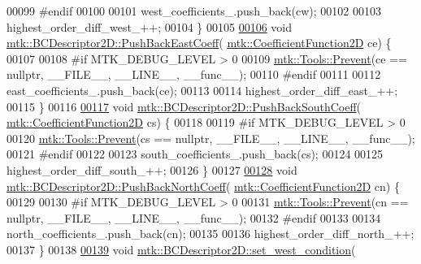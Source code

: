 \begin{DoxyCode}
00099 \textcolor{preprocessor}{  #endif}
00100 
00101   west\_coefficients\_.push\_back(cw);
00102 
00103   highest\_order\_diff\_west\_++;
00104 \}
00105 
\hypertarget{mtk__bc__descriptor__2d_8cc_source_l00106}{}\hyperlink{classmtk_1_1BCDescriptor2D_a27635428a6c36d1e305cafdc68271063}{00106} \textcolor{keywordtype}{void} \hyperlink{classmtk_1_1BCDescriptor2D_a27635428a6c36d1e305cafdc68271063}{mtk::BCDescriptor2D::PushBackEastCoeff}(
      \hyperlink{group__c07-mim__ops_gad9e1c0ace886b0029aefffa5f320e852}{mtk::CoefficientFunction2D} ce) \{
00107 
00108 \textcolor{preprocessor}{  #if MTK\_DEBUG\_LEVEL > 0}
00109   \hyperlink{classmtk_1_1Tools_a332324c6f25e66be9dff48c5987a3b9f}{mtk::Tools::Prevent}(ce == \textcolor{keyword}{nullptr}, \_\_FILE\_\_, \_\_LINE\_\_, \_\_func\_\_);
00110 \textcolor{preprocessor}{  #endif}
00111 
00112   east\_coefficients\_.push\_back(ce);
00113 
00114   highest\_order\_diff\_east\_++;
00115 \}
00116 
\hypertarget{mtk__bc__descriptor__2d_8cc_source_l00117}{}\hyperlink{classmtk_1_1BCDescriptor2D_a9eb891f14c68968a0113632fa5fea630}{00117} \textcolor{keywordtype}{void} \hyperlink{classmtk_1_1BCDescriptor2D_a9eb891f14c68968a0113632fa5fea630}{mtk::BCDescriptor2D::PushBackSouthCoeff}(
      \hyperlink{group__c07-mim__ops_gad9e1c0ace886b0029aefffa5f320e852}{mtk::CoefficientFunction2D} cs) \{
00118 
00119 \textcolor{preprocessor}{  #if MTK\_DEBUG\_LEVEL > 0}
00120   \hyperlink{classmtk_1_1Tools_a332324c6f25e66be9dff48c5987a3b9f}{mtk::Tools::Prevent}(cs == \textcolor{keyword}{nullptr}, \_\_FILE\_\_, \_\_LINE\_\_, \_\_func\_\_);
00121 \textcolor{preprocessor}{  #endif}
00122 
00123   south\_coefficients\_.push\_back(cs);
00124 
00125   highest\_order\_diff\_south\_++;
00126 \}
00127 
\hypertarget{mtk__bc__descriptor__2d_8cc_source_l00128}{}\hyperlink{classmtk_1_1BCDescriptor2D_a0fed58bd058d699a572888fe4b9934a4}{00128} \textcolor{keywordtype}{void} \hyperlink{classmtk_1_1BCDescriptor2D_a0fed58bd058d699a572888fe4b9934a4}{mtk::BCDescriptor2D::PushBackNorthCoeff}(
      \hyperlink{group__c07-mim__ops_gad9e1c0ace886b0029aefffa5f320e852}{mtk::CoefficientFunction2D} cn) \{
00129 
00130 \textcolor{preprocessor}{  #if MTK\_DEBUG\_LEVEL > 0}
00131   \hyperlink{classmtk_1_1Tools_a332324c6f25e66be9dff48c5987a3b9f}{mtk::Tools::Prevent}(cn == \textcolor{keyword}{nullptr}, \_\_FILE\_\_, \_\_LINE\_\_, \_\_func\_\_);
00132 \textcolor{preprocessor}{  #endif}
00133 
00134   north\_coefficients\_.push\_back(cn);
00135 
00136   highest\_order\_diff\_north\_++;
00137 \}
00138 
\hypertarget{mtk__bc__descriptor__2d_8cc_source_l00139}{}\hyperlink{classmtk_1_1BCDescriptor2D_a006050efe15b1be75b36a74a23051392}{00139} \textcolor{keywordtype}{void} \hyperlink{classmtk_1_1BCDescriptor2D_a006050efe15b1be75b36a74a23051392}{mtk::BCDescriptor2D::set\_west\_condition}(

\end{DoxyCode}
